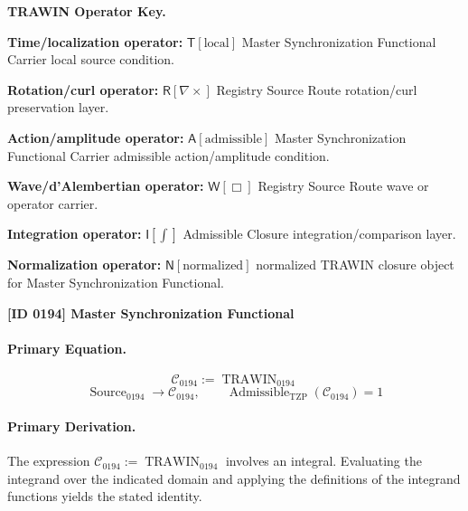 \par\vspace{0.45\baselineskip}
\noindent\begin{minipage}[t]{\linewidth}
\begingroup
\small
\raggedright
\textbf{TRAWIN Operator Key.}\par
\noindent\textbf{Time/localization operator:} $\mathsf{T}\!\left[\mathrm{local}\right]$ Master Synchronization Functional Carrier local source condition.\par
\noindent\textbf{Rotation/curl operator:} $\mathsf{R}\!\left[\nabla\times\right]$ Registry Source Route rotation/curl preservation layer.\par
\noindent\textbf{Action/amplitude operator:} $\mathsf{A}\!\left[\mathrm{admissible}\right]$ Master Synchronization Functional Carrier admissible action/amplitude condition.\par
\noindent\textbf{Wave/d'Alembertian operator:} $\mathsf{W}\!\left[\Box\right]$ Registry Source Route wave or operator carrier.\par
\noindent\textbf{Integration operator:} $\mathsf{I}\!\left[\int\right]$ Admissible Closure integration/comparison layer.\par
\noindent\textbf{Normalization operator:} $\mathsf{N}\!\left[\mathrm{normalized}\right]$ normalized TRAWIN closure object for Master Synchronization Functional.\par
\endgroup
\end{minipage}

\clearpage
\noindent\textbf{[ID 0194] Master Synchronization Functional}\par
\vspace{0.35em}
\paragraph{Primary Equation.}
\[
\mathcal{C}_{0194} := \operatorname{TRAWIN}_{0194}
\]
\[
\operatorname{Source}_{0194}\longrightarrow \mathcal{C}_{0194},
\qquad
\operatorname{Admissible}_{\mathrm{TZP}}\!\left(\mathcal{C}_{0194}\right)=1
\]

\paragraph{Primary Derivation.}
The expression \( \mathcal{C}_{0194} := \operatorname{TRAWIN}_{0194} \) involves an integral. Evaluating the integrand over the indicated domain and applying the definitions of the integrand functions yields the stated identity.
